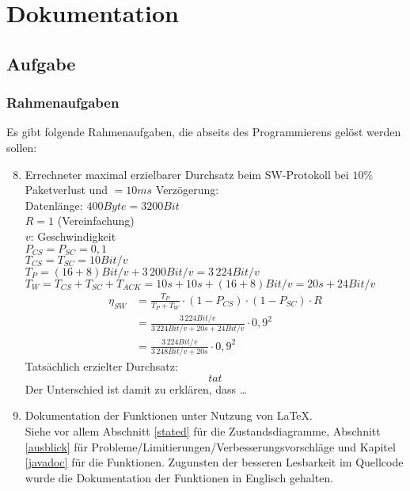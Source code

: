 \maketitle
\newpage
\tableofcontents
\newpage

\chapter{Dokumentation}

\section{Aufgabe}

\subsection{Rahmenaufgaben}

Es gibt folgende Rahmenaufgaben, die abseits des Programmierens gelöst werden sollen:
\begin{enumerate}
\setcounter{enumi}{7}
\item Errechneter maximal erzielbarer Durchsatz beim SW-Protokoll bei $10\%$ Paketverlust und $=10\unit{ms}$ Verzögerung:\\
Datenlänge: $400 \unit{Byte} = 3200\unit{Bit}$\\
$R=1$ (Vereinfachung)\\
$v$: Geschwindigkeit\\
$P_{CS}=P_{SC}=0,1$\\
$T_{CS}=T_{SC}=10\unit{Bit}/v$\\
$T_P=(16+8)\unit{Bit}/v+3\,200\unit{Bit}/v=3\,224\unit{Bit}/v$ \\
$T_W=T_{CS}+T_{SC}+T_{ACK}=10\unit{s}+10\unit{s}+(16+8)\unit{Bit}/v=20\unit{s}+24\unit{Bit}/v$
\begin{align*}
\eta_{SW}&=\frac{T_P}{T_P+ T_W}\cdot (1-P_{CS})\cdot(1-P_{SC}) \cdot R \\
&= \frac{3\,224\unit{Bit}/v}{3\,224\unit{Bit}/v+20\unit{s}+24\unit{Bit}/v}\cdot 0,9^2\\
&=\frac{3\,224\unit{Bit}/v}{3\,248\unit{Bit}/v+20\unit{s}}\cdot 0,9^2
\end{align*}
Tatsächlich erzielter Durchsatz:
$$tat$$
Der Unterschied ist damit zu erklären, dass …
\item Dokumentation der Funktionen unter Nutzung von \LaTeX{}.\\
Siehe vor allem Abschnitt \ref{stated} für die Zustandsdiagramme, Abschnitt \ref{ausblick} für Probleme/Limitierungen/Verbesserungsvorschläge  und Kapitel \ref{javadoc} für die Funktionen. Zugunsten der besseren Lesbarkeit im Quellcode wurde die Dokumentation der Funktionen in Englisch gehalten.
\end{enumerate}

